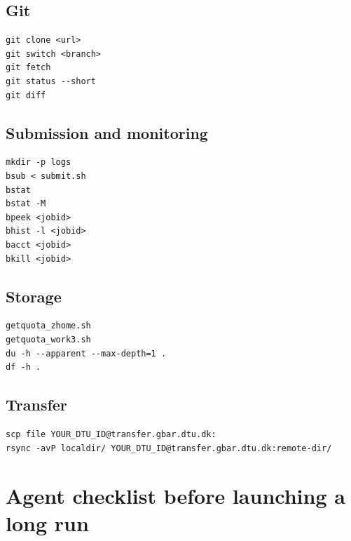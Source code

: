 \documentclass[11pt,a4paper]{article}
\begin{document}
\subsection{Git}

\begin{lstlisting}[style=shell]
git clone <url>
git switch <branch>
git fetch
git status --short
git diff
\end{lstlisting}

\subsection{Submission and monitoring}

\begin{lstlisting}[style=shell]
mkdir -p logs
bsub < submit.sh
bstat
bstat -M
bpeek <jobid>
bhist -l <jobid>
bacct <jobid>
bkill <jobid>
\end{lstlisting}

\subsection{Storage}

\begin{lstlisting}[style=shell]
getquota_zhome.sh
getquota_work3.sh
du -h --apparent --max-depth=1 .
df -h .
\end{lstlisting}

\subsection{Transfer}

\begin{lstlisting}[style=shell]
scp file YOUR_DTU_ID@transfer.gbar.dtu.dk:
rsync -avP localdir/ YOUR_DTU_ID@transfer.gbar.dtu.dk:remote-dir/
\end{lstlisting}

\section{Agent checklist before launching a long run}
\end{document}
